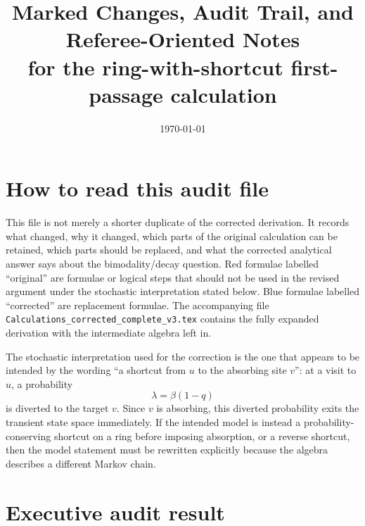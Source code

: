 \documentclass[11pt]{article}
\title{Marked Changes, Audit Trail, and Referee-Oriented Notes\\
for the ring-with-shortcut first-passage calculation}
\author{}
\date{\today}
\begin{document}
\maketitle
\tableofcontents

\section{How to read this audit file}

This file is not merely a shorter duplicate of the corrected derivation.  It records what changed,
why it changed, which parts of the original calculation can be retained, which parts should be
replaced, and what the corrected analytical answer says about the bimodality/decay question.  Red
formulae labelled ``original'' are formulae or logical steps that should not be used in the revised
argument under the stochastic interpretation stated below.  Blue formulae labelled ``corrected'' are
replacement formulae.  The accompanying file
\texttt{Calculations\_corrected\_complete\_v3.tex} contains the fully expanded derivation with the
intermediate algebra left in.

The stochastic interpretation used for the correction is the one that appears to be intended by the
wording ``a shortcut from $u$ to the absorbing site $v$'': at a visit to $u$, a probability
\begin{equation}
  \lambda=\beta(1-q)
\end{equation}
is diverted to the target $v$.  Since $v$ is absorbing, this diverted probability exits the
transient state space immediately.  If the intended model is instead a probability-conserving
shortcut on a ring before imposing absorption, or a reverse shortcut, then the model statement must
be rewritten explicitly because the algebra describes a different Markov chain.

\section{Executive audit result}
\end{document}
